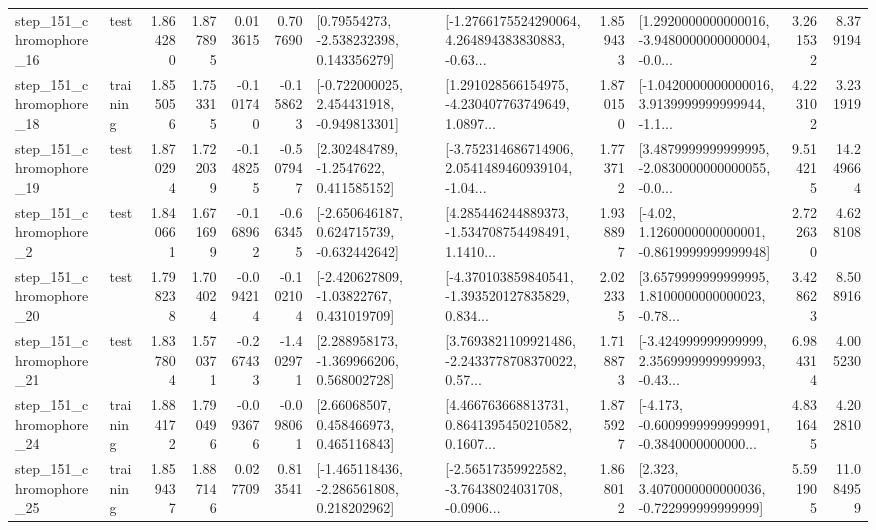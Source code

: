 \begin{tabular}{llrrrrllrlrr}
  step\_151\_chromophore\_16 &      test &      1.864280 &    1.877895 &      0.013615 &  0.707690 &     [0.79554273, -2.538232398, 0.143356279] &  [-1.2766175524290064, 4.264894383830883, -0.63... &       1.859433 &  [1.2920000000000016, -3.9480000000000004, -0.0... &            3.261532 &          8.379194 \\
  step\_151\_chromophore\_18 &  training &      1.855056 &    1.753315 &     -0.101740 & -0.158623 &   [-0.722000025, 2.454431918, -0.949813301] &  [1.291028566154975, -4.230407763749649, 1.0897... &       1.870150 &  [-1.0420000000000016, 3.9139999999999944, -1.1... &            4.223102 &          3.231919 \\
  step\_151\_chromophore\_19 &      test &      1.870294 &    1.722039 &     -0.148255 & -0.507947 &      [2.302484789, -1.2547622, 0.411585152] &  [-3.752314686714906, 2.0541489460939104, -1.04... &       1.773712 &  [3.4879999999999995, -2.0830000000000055, -0.0... &            9.514215 &         14.249664 \\
   step\_151\_chromophore\_2 &      test &      1.840661 &    1.671699 &     -0.168962 & -0.663455 &   [-2.650646187, 0.624715739, -0.632442642] &  [4.285446244889373, -1.534708754498491, 1.1410... &       1.938897 &   [-4.02, 1.1260000000000001, -0.8619999999999948] &            2.722630 &          4.628108 \\
  step\_151\_chromophore\_20 &      test &      1.798238 &    1.704024 &     -0.094214 & -0.102104 &    [-2.420627809, -1.03822767, 0.431019709] &  [-4.370103859840541, -1.393520127835829, 0.834... &       2.022335 &  [3.6579999999999995, 1.8100000000000023, -0.78... &            3.428623 &          8.508916 \\
  step\_151\_chromophore\_21 &      test &      1.837804 &    1.570371 &     -0.267433 & -1.402971 &    [2.288958173, -1.369966206, 0.568002728] &  [3.7693821109921486, -2.2433778708370022, 0.57... &       1.718873 &  [-3.424999999999999, 2.3569999999999993, -0.43... &            6.984314 &          4.005230 \\
  step\_151\_chromophore\_24 &  training &      1.884172 &    1.790496 &     -0.093676 & -0.098061 &      [2.66068507, 0.458466973, 0.465116843] &  [4.466763668813731, 0.8641395450210582, 0.1607... &       1.875927 &  [-4.173, -0.6009999999999991, -0.3840000000000... &            4.831645 &          4.202810 \\
  step\_151\_chromophore\_25 &  training &      1.859437 &    1.887146 &      0.027709 &  0.813541 &   [-1.465118436, -2.286561808, 0.218202962] &  [-2.56517359922582, -3.76438024031708, -0.0906... &       1.868012 &    [2.323, 3.4070000000000036, -0.722999999999999] &            5.591905 &         11.084959 \\

\end{tabular}
